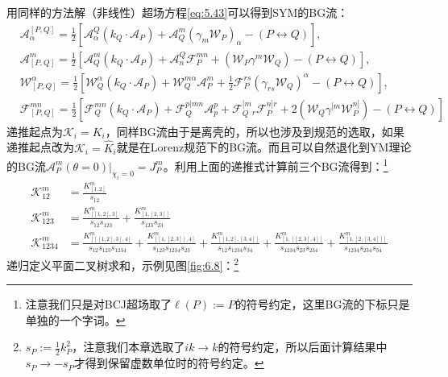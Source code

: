 用同样的方法解（非线性）超场方程\ref{eq:5.43}可以得到SYM的BG流：\cite{Lee:2015upy}
\begin{equation}
	\begin{aligned}
		&\mathcal{A}_{\alpha}^{[P,Q]}=\frac{1}{2}\left[\mathcal{A}_\alpha^  {Q}(k_Q\cdot\mathcal{A}_P)+\mathcal{A}_  {Q}^m(\gamma_m\mathcal{W}_P)_\alpha-(P\leftrightarrow  {Q})\right],\\&\mathcal{A}_{[P,  {Q}]}^m=\frac{1}{2}\left[\mathcal{A}_Q^m(k_Q\cdot\mathcal{A}_P)+\mathcal{A}_n^Q\mathcal{F}_P^{mn}+(\mathcal{W}_P\gamma^m\mathcal{W}_  {Q})-(P\leftrightarrow  Q)\right],\\&\mathcal{W}_{[P,  {Q}]}^{\alpha}=\frac{1}{2}\left[\mathcal{W}_Q^\alpha(k_Q\cdot\mathcal{A}_P)+\mathcal{W}_Q^{m\alpha}\mathcal{A}_P^m+\frac{1}{2}\mathcal{F}_P^{rs}(\gamma_{rs}\mathcal{W}_Q)^\alpha-(P\leftrightarrow  Q)\right],\\&\mathcal{F}_{[  {P},  {Q}]}^{mn}=\frac{1}{2}\left[\mathcal{F}_{  {Q}}^{mn}(k_{  {Q}}\cdot\mathcal{A}_{  {P}})+\mathcal{F}_{  {Q}}^{p|mn}\mathcal{A}_{p}^{p}+\mathcal{F}_{  {Q}}^{[m}{}_{r}\mathcal{F}_{P}^{n]r}+2(\mathcal{W}_{  {Q}}\gamma^{[m}\mathcal{W}_{P}^{n]})-(P\leftrightarrow  Q)\right]
	\end{aligned}
\end{equation}
递推起点为$\mathcal{K}_i = K_i$，同样BG流由于是离壳的，所以也涉及到规范的选取，如果递推起点改为$\mathcal{K}_i = \hat{K}_i$就是在Lorenz规范下的BG流。而且可以自然退化到YM理论的BG流$\mathcal{A}_{P}^{m}(\theta=0)|_{\chi_{i}=0}=J_{P}^{m}$。利用上面的递推式计算前三个BG流得到：\footnote{注意我们只是对BCJ超场取了$\ell(P):= P$的符号约定，这里BG流的下标只是单独的一个字词。}
\begin{equation}
	\begin{aligned}
		\mathcal{ K}_{12}^{m}&=\frac{ K_{[1,2]}^m}{s_{12}}\\
		\mathcal{ K}_{123}^{m}&=\frac{ K_{[[1,2],3]}^m}{s_{12}s_{123}}+\frac{ K_{[1,[2,3]]}^m}{s_{123}s_{23}}\\
		\mathcal{ K}_{1234}^m&=\frac{ K_{[[[1,2],3],4]}^m}{s_{12}s_{123}s_{1234}}+\frac{ K_{[[1,[2,3]],4]}^m}{s_{123}s_{1234}s_{23}}+\frac{ K_{[[1,2],[3,4]]}^m}{s_{12}s_{1234}s_{34}}+\frac{ K_{[1,[[2,3],4]]}^m}{s_{1234}s_{23}s_{234}}+\frac{ K_{[1,[2,[3,4]]]}^m}{s_{1234}s_{234}s_{34}}
	\end{aligned}
\end{equation}
递归定义平面二叉树求和\cite{Mafra:2020qst}，示例见图\ref{fig:6.8}：\footnote{$s_P:=\frac12 k_P^2$，注意我们本章选取了$ik\to k$的符号约定，所以后面计算结果中$s_P\to -s_P$才得到保留虚数单位时的符号约定。}
